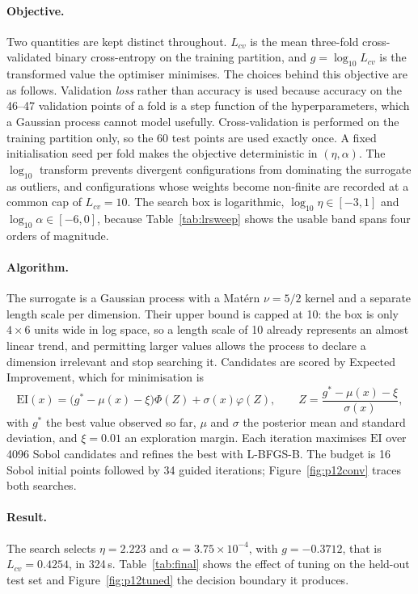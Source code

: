 \documentclass[11pt,a4paper]{article}
\begin{document}
\paragraph{Objective.} Two quantities are kept distinct throughout. $L_{cv}$ is the
mean three-fold cross-validated binary cross-entropy on the training partition, and
$g=\log_{10}L_{cv}$ is the transformed value the optimiser minimises. The choices
behind this objective are as follows. Validation \emph{loss} rather than accuracy is
used because accuracy on the 46--47 validation points of a fold is a step function of
the hyperparameters, which a Gaussian process cannot model usefully. Cross-validation is
performed on the training partition only, so the 60 test points are used exactly once.
A fixed initialisation seed per fold makes the objective deterministic in
$(\eta,\alpha)$. The $\log_{10}$ transform prevents divergent configurations from
dominating the surrogate as outliers, and configurations whose weights become
non-finite are recorded at a common cap of $L_{cv}=10$. The search box is
logarithmic, $\log_{10}\eta\in[-3,1]$ and $\log_{10}\alpha\in[-6,0]$, because
Table~\ref{tab:lrsweep} shows the usable band spans four orders of magnitude.

\paragraph{Algorithm.} The surrogate is a Gaussian process with a Mat\'ern
$\nu=5/2$ kernel and a separate length scale per dimension. Their upper bound is
capped at 10: the box is only $4\times6$ units wide in log space, so a length scale of
10 already represents an almost linear trend, and permitting larger values allows the
process to declare a dimension irrelevant and stop searching it. Candidates are scored
by Expected Improvement, which for minimisation is
\begin{equation}
\mathrm{EI}(x) = \big(g^{*}-\mu(x)-\xi\big)\Phi(Z) + \sigma(x)\varphi(Z),
\qquad
Z = \frac{g^{*}-\mu(x)-\xi}{\sigma(x)},
\end{equation}
with $g^{*}$ the best value observed so far, $\mu$ and $\sigma$ the posterior mean
and standard deviation, and $\xi=0.01$ an exploration margin. Each iteration maximises
$\mathrm{EI}$ over 4096 Sobol candidates and refines the best with L-BFGS-B. The
budget is 16 Sobol initial points followed by 34 guided iterations;
Figure~\ref{fig:p12conv} traces both searches.

\paragraph{Result.} The search selects
$\eta = 2.223$ and
$\alpha = 3.75\times 10^{-4}$, with
$g = -0.3712$, that is $L_{cv} = 0.4254$, in
324\,s. Table~\ref{tab:final} shows the effect of tuning
on the held-out test set and Figure~\ref{fig:p12tuned} the decision boundary it
produces.
\end{document}
